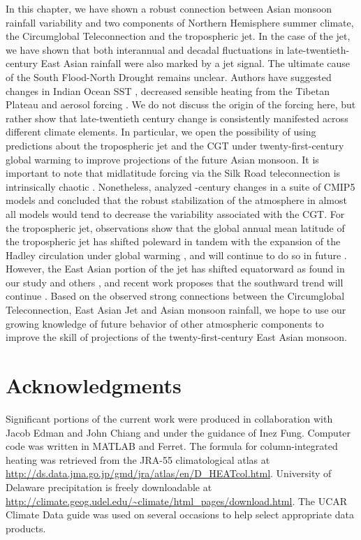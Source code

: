 	 In this chapter, we have shown a robust connection between Asian monsoon rainfall variability and two components of Northern Hemisphere summer climate, the Circumglobal Teleconnection and the tropospheric jet. In the case of the jet, we have shown that both interannual and decadal fluctuations in late-twentieth-century East Asian rainfall were also marked by a jet signal. The ultimate cause of the South Flood-North Drought remains unclear. Authors have suggested changes in Indian Ocean SST \citep{Qu2012}, decreased sensible heating from the Tibetan Plateau \citep{Liu2012a,Hu2015} and aerosol forcing \citep{Song2014}. We do not discuss the origin of the forcing here, but rather show that late-twentieth century change is consistently manifested across different climate elements. In particular, we open the possibility of using predictions about the tropospheric jet and the CGT under twenty-first-century global warming to improve projections of the future Asian monsoon. It is important to note that midlatitude forcing via the Silk Road teleconnection is intrinsically chaotic \citep{Kosaka2012}. Nonetheless, \citet{Lee2014} analyzed -century changes in a suite of CMIP5 models and concluded that the robust stabilization of the atmosphere in almost all models would tend to decrease the variability associated with the CGT. For the tropospheric jet, observations show that the global annual mean latitude of the tropospheric jet has shifted poleward in tandem with the expansion of the Hadley circulation under global warming \citep{Fu2006,Archer2008,Fu2011}, and will continue to do so in future \citep{Lu2007,Kang2012}. However, the East Asian portion of the jet has shifted equatorward as found in our study and others \citep{Yu2007, Archer2008,Park2014a}, and recent work proposes that the southward trend will continue \citep{Park2014}. Based on the observed strong connections between the Circumglobal Teleconnection, East Asian Jet and Asian monsoon rainfall, we hope to use our growing knowledge of future behavior of other atmospheric components to improve the skill of projections of the twenty-first-century East Asian monsoon.

\section{Acknowledgments}

	Significant portions of the current work were produced in collaboration with Jacob Edman and John Chiang and under the guidance of Inez Fung. Computer code was written in MATLAB and Ferret. The formula for column-integrated heating was retrieved from the JRA-55 climatological atlas at \url{http://ds.data.jma.go.jp/gmd/jra/atlas/en/D_HEATcol.html}. University of Delaware precipitation is freely downloadable at \url{http://climate.geog.udel.edu/~climate/html_pages/download.html}. The UCAR Climate Data guide was used on several occasions to help select appropriate data products.

